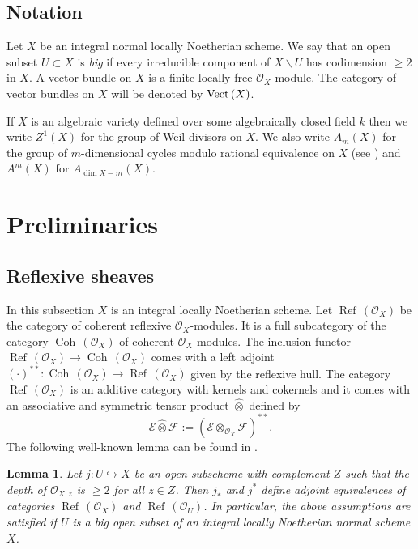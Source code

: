 \documentclass[twoside, 11pt]{article}
\theoremstyle{plain}
\newtheorem{Lemma}[Thm]{\sc Lemma}
\theoremstyle{definition}
\theoremstyle{remark}
\newcommand{\cE}{{\mathcal E}}
\newcommand{\cF}{{\mathcal F}}
\newcommand{\cO}{{\mathcal O}}
\newcommand{\Coh}{{\mathop{\operatorname{Coh}\, }}}
\newcommand{\Refl}{{\mathop{\operatorname{Ref}\, }}}
\newcommand{\Vect}{{\mathop{{\rm Vect \,}}}}
\begin{document}
\medskip


\subsection*{Notation}

Let $X$ be an integral normal  locally Noetherian scheme.
We say that an open subset $U\subset X$ is \emph{big} if every irreducible component of $X\backslash U$
has codimension $\ge 2$ in $X$.
A vector bundle on $X$ is a finite locally free $\cO_X$-module. The category of vector bundles on $X$ will be denoted by $\Vect (X)$.

If $X$ is an algebraic variety defined over some algebraically closed field $k$ then we write
$Z^1(X)$  for the group of Weil divisors on $X$. We also write $A_m(X)$ for the  group of $m$-dimensional cycles modulo rational equivalence on $X$ (see \cite[1.3]{Fu}) and $A^m(X)$ for $A_{
\dim X-m}(X)$.

\section{Preliminaries}

\subsection{Reflexive sheaves}\label{reflexive-sheaves}

In this subsection $X$ is an integral locally Noetherian scheme.
Let  $\Refl(\cO_X)$  be the category of coherent reflexive $\cO_X$-modules. It is a full subcategory of the category $\Coh(\cO_X)$ of coherent  $\cO_X$-modules. 
The inclusion functor $\Refl(\cO_X)\to \Coh (\cO_X)$ comes with a left adjoint $(\cdot )^{**}:\Coh(\cO_X)\to \Refl (\cO_X)$ given by the reflexive hull. The category $\Refl(\cO_X)$  is an additive category with kernels and cokernels and it comes with an associative and symmetric tensor product $\hat\otimes$ defined by
$$\cE\hat\otimes \cF:=(\cE\otimes _{\cO_X} \cF)^{**}.$$
The following well-known lemma can be found in \cite[Lemma 0EBJ]{SP}.

\begin{Lemma}\label{restriction-to-open} 
Let $j: U\hookrightarrow X $ be an open subscheme  with complement $Z$ such that the depth of $\cO_{X,z}$ is $\ge 2$ for all $z\in Z$. Then  $j_*$ and $j^*$ define adjoint equivalences of categories $\Refl (\cO_X)$ and $\Refl(\cO_U)$. In particular, the above assumptions are satisfied if $U$
is a big open subset of an integral locally Noetherian normal scheme $X$.  
\end{Lemma}
\end{document}
